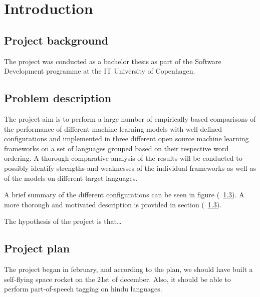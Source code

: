 
\section{Introduction}

\subsection{Project background}

The project was conducted as a bachelor thesis as part of the Software
Development programme at the IT University of Copenhagen. 


\subsection{Problem description}

The project aim is to perform a large number of empirically based comparisons of
the performance of different machine learning models with well-defined
configurations and implemented in three different open source machine learning
frameworks on a set of languages grouped based on their respective word
ordering. A thorough comparative analysis of the results will be conducted to
possibly identify strengths and weaknesses of the individual frameworks as well
as of the models on different target languages.

A brief summary of the different configurations can be seen in figure (~\ref{}). A
more thorough and motivated description is provided in section (~\ref{}).

The hypothesis of the project is that\ldots


\subsection{Project plan}

The project began in february, and according to the plan, we should have built a
self-flying space rocket on the 21st of december. Also, it should be able to
perform part-of-speech tagging on hindu languages.

\pagebreak
